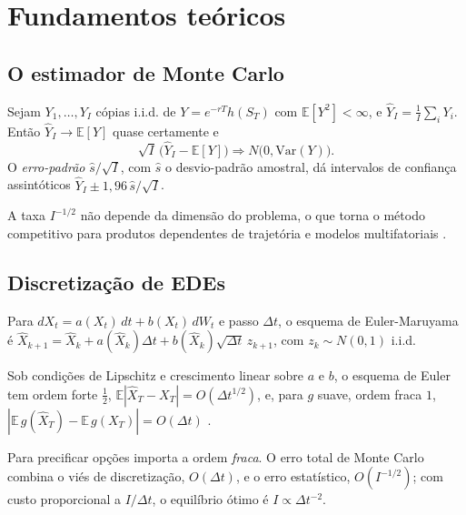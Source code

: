 \section{Fundamentos teóricos}

\subsection{O estimador de Monte Carlo}

\begin{proposicao}
Sejam $Y_1,\dots,Y_I$ cópias i.i.d. de $Y=e^{-rT}h(S_T)$ com $\mathbb E[Y^2]<\infty$, e $\hat Y_I=\frac1I\sum_iY_i$. Então $\hat Y_I\to\mathbb E[Y]$ quase certamente e
\begin{equation}
\sqrt I\,\big(\hat Y_I-\mathbb E[Y]\big)\Rightarrow N\big(0,\mathrm{Var}(Y)\big).
\end{equation}
O \emph{erro-padrão} $\hat s/\sqrt I$, com $\hat s$ o desvio-padrão amostral, dá intervalos de confiança assintóticos $\hat Y_I\pm1{,}96\,\hat s/\sqrt I$.
\end{proposicao}

A taxa $I^{-1/2}$ não depende da dimensão do problema, o que torna o método competitivo para produtos dependentes de trajetória e modelos multifatoriais \citep{boylebroadieglasserman1997,glasserman2004}.

\subsection{Discretização de EDEs}

\begin{definicao}
Para $dX_t=a(X_t)\,dt+b(X_t)\,dW_t$ e passo $\Delta t$, o esquema de Euler-Maruyama é $\hat X_{k+1}=\hat X_k+a(\hat X_k)\Delta t+b(\hat X_k)\sqrt{\Delta t}\,z_{k+1}$, com $z_k\sim N(0,1)$ i.i.d.
\end{definicao}

\begin{teorema}
Sob condições de Lipschitz e crescimento linear sobre $a$ e $b$, o esquema de Euler tem ordem forte $\tfrac12$, $\mathbb E|\hat X_T-X_T|=O(\Delta t^{1/2})$, e, para $g$ suave, ordem fraca $1$, $|\mathbb E\,g(\hat X_T)-\mathbb E\,g(X_T)|=O(\Delta t)$ \citep{kloedenplaten1992}.
\end{teorema}

Para precificar opções importa a ordem \emph{fraca}. O erro total de Monte Carlo combina o viés de discretização, $O(\Delta t)$, e o erro estatístico, $O(I^{-1/2})$; com custo proporcional a $I/\Delta t$, o equilíbrio ótimo é $I\propto\Delta t^{-2}$.

